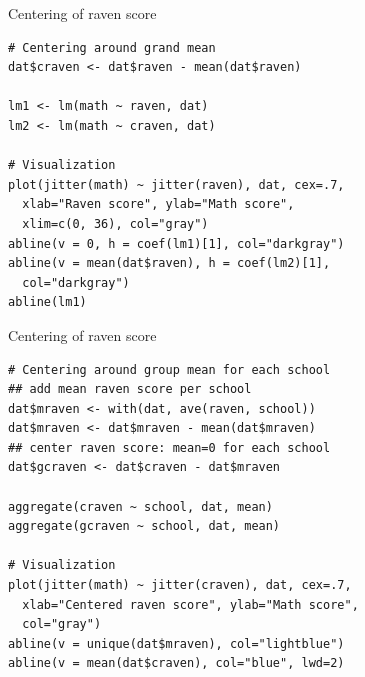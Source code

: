 \documentclass{beamer}
\begin{document}
{

\begin{frame}[fragile]{Centering of raven score}
  \begin{lstlisting}
# Centering around grand mean
dat$craven <- dat$raven - mean(dat$raven)

lm1 <- lm(math ~ raven, dat)
lm2 <- lm(math ~ craven, dat)

# Visualization
plot(jitter(math) ~ jitter(raven), dat, cex=.7, 
  xlab="Raven score", ylab="Math score", 
  xlim=c(0, 36), col="gray")
abline(v = 0, h = coef(lm1)[1], col="darkgray")
abline(v = mean(dat$raven), h = coef(lm2)[1],
  col="darkgray")
abline(lm1)
  \end{lstlisting}
\end{frame}

\begin{frame}[fragile]{Centering of raven score}
  \begin{lstlisting}
# Centering around group mean for each school
## add mean raven score per school
dat$mraven <- with(dat, ave(raven, school))
dat$mraven <- dat$mraven - mean(dat$mraven)
## center raven score: mean=0 for each school
dat$gcraven <- dat$craven - dat$mraven

aggregate(craven ~ school, dat, mean)
aggregate(gcraven ~ school, dat, mean)

# Visualization
plot(jitter(math) ~ jitter(craven), dat, cex=.7, 
  xlab="Centered raven score", ylab="Math score", 
  col="gray")
abline(v = unique(dat$mraven), col="lightblue")
abline(v = mean(dat$craven), col="blue", lwd=2)
  \end{lstlisting}
\end{frame}

}
\end{document}
